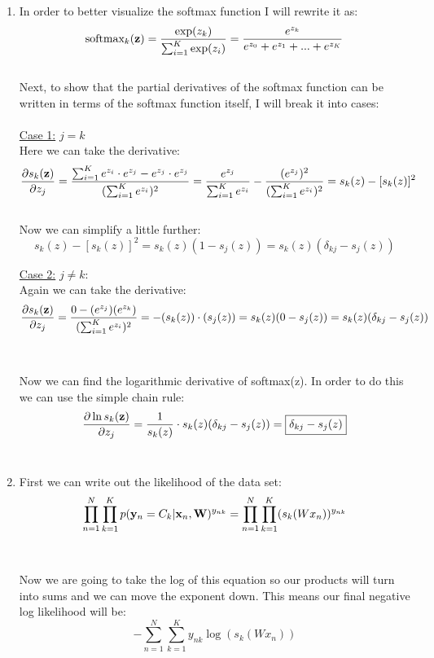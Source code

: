 \documentclass[submit]{harvardml}
\begin{document}
\begin{enumerate}
    \item 
    In order to better visualize the softmax function I will rewrite it as:\\
    $$
    \text{softmax}_k(\mathbf{z}) = \frac{\exp(z_k)}{\sum_{i = 1}^K \exp(z_i)} = \frac{e^{z_k}}{e^{z_0} + e^{z_1} + ... + e^{z_K}}
    $$\\
    Next, to show that the partial derivatives of the softmax function can be written in terms of the softmax function itself, I will break it into cases:\\
    \\
    \underline{Case 1:} $j=k$\\
    Here we can take the derivative:\\
    $$
    \frac{\partial s_k(\mathbf{z})}{\partial z_j} = \frac{\sum_{i=1}^Ke^{z_i}\cdot e^{z_j} - e^{z_j}\cdot e^{z_j}}{(\sum_{i=1}^Ke^{z_i})^2} = \frac{e^{z_j}}{\sum_{i=1}^Ke^{z_i}} - \frac{(e^{z_j})^2}{(\sum_{i=1}^Ke^{z_i})^2} = s_k(z) - [s_k(z)]^2
      $$\\
    Now we can simplify a little further:\\
    $$
    s_k(z) - [s_k(z)]^2 = s_k(z) (1 - s_j(z)) = s_k(z) (\delta_{kj} - s_j(z))
    $$
    
    \underline{Case 2:} $j \neq k$:\\
    Again we can take the derivative:\\
    $$
    \frac{\partial s_k(\mathbf{z})}{\partial z_j} = \frac{0 - (e^{z_j})(e^{z_k})}{(\sum_{i=1}^Ke^{z_i})^2} = -(s_k(z))\cdot(s_j(z)) = s_k(z)(0 - s_j(z)) = s_k(z) (\delta_{kj} - s_j(z))$$\\
    \\
    Now we can find the logarithmic derivative of softmax(z). In order to do this we can use the simple chain rule:\\
    $$\frac{\partial \ln s_k(\mathbf{z})}{\partial z_j} = \frac{1}{s_k(z)}\cdot s_k(z) (\delta_{kj} - s_j(z)) = \boxed{\delta_{kj} - s_j(z)}$$\\
    
    \item
    First we can write out the likelihood of the data set:\\
    $$\prod_{n=1}^N\prod_{k=1}^Kp(\mathbf{y}_n = C_k | \mathbf{x}_n, \mathbf{W})^{y_{nk}} = \prod_{n=1}^N\prod_{k=1}^K(s_k(Wx_n))^{y_{nk}}$$\\
    \\
    Now we are going to take the log of this equation so our products will turn into sums and we can move the exponent down. This means our final negative log likelihood will be:\\
    $$\boxed{-\sum_{n=1}^N\sum_{k=1}^Ky_{nk}\log(s_k(Wx_n))}$$\\
    

\end{enumerate}
\end{document}
